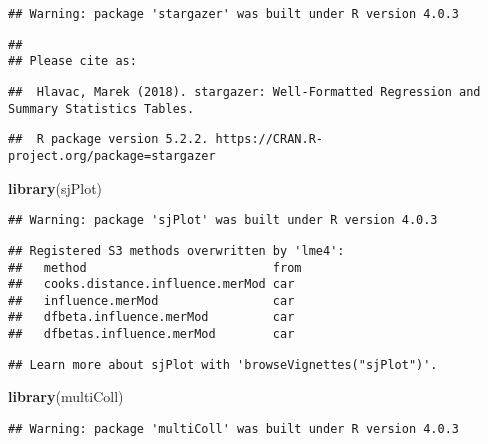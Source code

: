 \documentclass[
]{article}
\newenvironment{Shaded}{\begin{snugshade}}{\end{snugshade}}
\newcommand{\KeywordTok}[1]{\textcolor[rgb]{0.13,0.29,0.53}{\textbf{#1}}}
\newcommand{\NormalTok}[1]{#1}
\begin{document}
\begin{verbatim}
## Warning: package 'stargazer' was built under R version 4.0.3
\end{verbatim}

\begin{verbatim}
## 
## Please cite as:
\end{verbatim}

\begin{verbatim}
##  Hlavac, Marek (2018). stargazer: Well-Formatted Regression and Summary Statistics Tables.
\end{verbatim}

\begin{verbatim}
##  R package version 5.2.2. https://CRAN.R-project.org/package=stargazer
\end{verbatim}

\begin{Shaded}
\begin{Highlighting}[]
\KeywordTok{library}\NormalTok{(sjPlot)}
\end{Highlighting}
\end{Shaded}

\begin{verbatim}
## Warning: package 'sjPlot' was built under R version 4.0.3
\end{verbatim}

\begin{verbatim}
## Registered S3 methods overwritten by 'lme4':
##   method                          from
##   cooks.distance.influence.merMod car 
##   influence.merMod                car 
##   dfbeta.influence.merMod         car 
##   dfbetas.influence.merMod        car
\end{verbatim}

\begin{verbatim}
## Learn more about sjPlot with 'browseVignettes("sjPlot")'.
\end{verbatim}

\begin{Shaded}
\begin{Highlighting}[]
\KeywordTok{library}\NormalTok{(multiColl)}
\end{Highlighting}
\end{Shaded}

\begin{verbatim}
## Warning: package 'multiColl' was built under R version 4.0.3
\end{verbatim}
\end{document}
